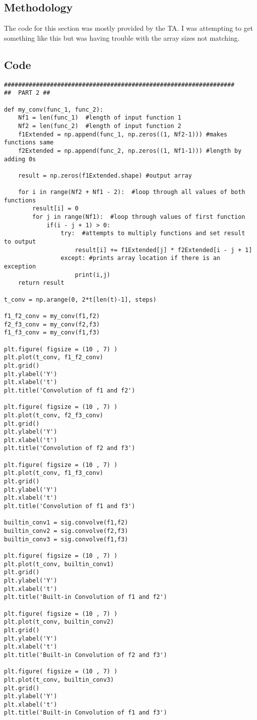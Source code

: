 \subsection{Methodology}
The code for this section was mostly provided by the TA.  I was attempting to get something like this but was having trouble with the array sizes not matching.
\subsection*{Code}
\begin{scriptsize}
\begin{lstlisting}
#################################################################
##  PART 2 ##

def my_conv(func_1, func_2):
    Nf1 = len(func_1)  #length of input function 1
    Nf2 = len(func_2)  #length of input function 2
    f1Extended = np.append(func_1, np.zeros((1, Nf2-1))) #makes functions same
    f2Extended = np.append(func_2, np.zeros((1, Nf1-1))) #length by adding 0s   
        
    result = np.zeros(f1Extended.shape) #output array

    for i in range(Nf2 + Nf1 - 2):  #loop through all values of both functions
        result[i] = 0
        for j in range(Nf1):  #loop through values of first function
            if(i - j + 1) > 0:
                try:  #attempts to multiply functions and set result to output
                    result[i] += f1Extended[j] * f2Extended[i - j + 1]
                except: #prints array location if there is an exception
                    print(i,j)                    
    return result    

t_conv = np.arange(0, 2*t[len(t)-1], steps)

f1_f2_conv = my_conv(f1,f2)
f2_f3_conv = my_conv(f2,f3)
f1_f3_conv = my_conv(f1,f3)

plt.figure( figsize = (10 , 7) )
plt.plot(t_conv, f1_f2_conv)
plt.grid()
plt.ylabel('Y')
plt.xlabel('t')
plt.title('Convolution of f1 and f2')

plt.figure( figsize = (10 , 7) )
plt.plot(t_conv, f2_f3_conv)
plt.grid()
plt.ylabel('Y')
plt.xlabel('t')
plt.title('Convolution of f2 and f3')

plt.figure( figsize = (10 , 7) )
plt.plot(t_conv, f1_f3_conv)
plt.grid()
plt.ylabel('Y')
plt.xlabel('t')
plt.title('Convolution of f1 and f3')

builtin_conv1 = sig.convolve(f1,f2)
builtin_conv2 = sig.convolve(f2,f3)
builtin_conv3 = sig.convolve(f1,f3)

plt.figure( figsize = (10 , 7) )
plt.plot(t_conv, builtin_conv1)
plt.grid()
plt.ylabel('Y')
plt.xlabel('t')
plt.title('Built-in Convolution of f1 and f2')

plt.figure( figsize = (10 , 7) )
plt.plot(t_conv, builtin_conv2)
plt.grid()
plt.ylabel('Y')
plt.xlabel('t')
plt.title('Built-in Convolution of f2 and f3')

plt.figure( figsize = (10 , 7) )
plt.plot(t_conv, builtin_conv3)
plt.grid()
plt.ylabel('Y')
plt.xlabel('t')
plt.title('Built-in Convolution of f1 and f3')
\end{lstlisting}
\end{scriptsize}
